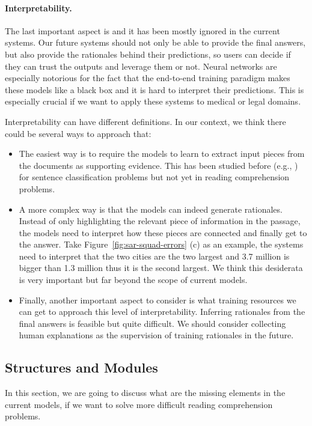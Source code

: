 \paragraph{Interpretability.} The last important aspect is  and it has been mostly ignored in the current systems.  Our future systems should not only be able to provide the final answers, but also provide the rationales behind their predictions, so users can decide if they can trust the outputs and leverage them or not. Neural networks are especially notorious for the fact that the end-to-end training paradigm makes these models like a black box and it is hard to interpret their predictions. This is especially crucial if we want to apply these systems to medical or legal domains.

Interpretability can have different definitions. In our context, we think there could be several ways to approach that:
\begin{itemize}
    \item
        The easiest way is to require the models to learn to extract input pieces from the documents as supporting evidence. This has been studied before (e.g., \cite{lei2016rationalizing}) for sentence classification problems but not yet in reading comprehension problems.
    \item
        A more complex way is that the models can indeed generate rationales. Instead of only highlighting the relevant piece of information in the passage, the models need to interpret how these pieces are connected and finally get to the answer. Take Figure~\ref{fig:sar-squad-errors} (c) as an example, the systems need to interpret that the two cities are the two largest and 3.7 million is bigger than 1.3 million thus it is the second largest. We think this desiderata is very important but far beyond the scope of current models.
    \item
        Finally, another important aspect to consider is what training resources we can get to approach this level of interpretability. Inferring rationales from the final answers is feasible but quite difficult. We should consider collecting human explanations as the supervision of training rationales in the future.
\end{itemize}

\subsection{Structures and Modules}
In this section, we are going to discuss what are the missing elements in the current models, if we want to solve more difficult reading comprehension problems.

